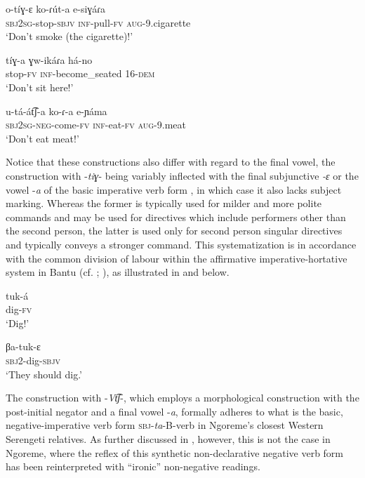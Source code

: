\documentclass[output=paper,colorlinks,citecolor=brown,draftmode]{langscibook}
\begin{document}
\ea\label{ex:ngo:19} 
    \gll o-tíɣ{}-ɛ ko-ɾút-a e-siɣáɾa\\ 
        \textsc{sbj}2\textsc{sg}{}-stop-\textsc{sbjv} \textsc{inf}{}-pull-\textsc{fv} \textsc{aug}{}-9.cigarette \\
    \glt ‘Don’t smoke (the cigarette)!’
\z 


\ea\label{ex:ngo:20} 
    \gll tíɣ{}-a ɣw-ikáɾa há-no\\ 
      stop-\textsc{fv} \textsc{inf}{}-become\_seated 16-\textsc{dem}\\
    \glt ‘Don’t sit here!’
\z 

\ea\label{ex:ngo:21} 
    \gll u-tá-át͡ʃ-a ko-ɾ{}-a e-ɲáma\\ 
        \textsc{sbj}2\textsc{sg}{}-\textsc{neg}{}-come-\textsc{fv} \textsc{inf}{}-eat-\textsc{fv} \textsc{aug}{}-9.meat\\
    \glt ‘Don’t eat meat!’
\z 


Notice that these constructions also differ with regard to the final vowel, the construction with \nobreakdash-\textit{tiɣ}\nobreakdash- being variably inflected with the final subjunctive \textit{\nobreakdash-ɛ}  or the vowel \nobreakdash-\textit{a} of the basic imperative verb form , in which case it also lacks subject marking. Whereas the former is typically used for milder and more polite commands and may be used for directives which include performers other than the second person, the latter is used only for second person singular directives and typically conveys a stronger command. This systematization is in accordance with the common division of labour within the affirmative imperative-hortative system in Bantu (cf. \citealt{DevosVanOlmen2013}; \citealt{NurseDevos2019}), as illustrated in  and  below. 

\ea\label{ex:ngo:22} 
    \gll tuk-á\\ 
     dig-\textsc{fv}\\
    \glt ‘Dig!’
\z 

\ea\label{ex:ngo:23} 
    \gll βa-tuk-ɛ\\ 
        \textsc{sbj}2-dig-\textsc{sbjv}\\
    \glt ‘They should dig.’
\z 

The construction with \nobreakdash-\textit{Vt͡ʃ}\nobreakdash-, which employs a morphological construction with the post-initial negator and a final vowel \nobreakdash-\textit{a}, formally adheres to what is the basic, negative-imperative verb form \textsc{sbj}{}-\textit{ta}{}-B-verb in Ngoreme’s closest Western Serengeti relatives. As further discussed in , however, this is not the case in Ngoreme, where the reflex of this synthetic non-declarative negative verb form has been reinterpreted with “ironic” non-negative readings.
\end{document}
